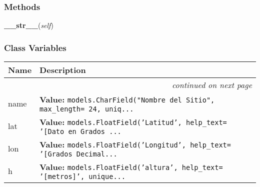  \subsubsection{Methods}

    \label{GroundSegment:models:Sitio:Sitio:__str__}

    \vspace{0.5ex}

\hspace{.8\funcindent}\begin{boxedminipage}{\funcwidth}

    \raggedright \textbf{\_\_str\_\_}(\textit{self})

\setlength{\parskip}{2ex}
\setlength{\parskip}{1ex}
    \end{boxedminipage}



  \subsubsection{Class Variables}

    \vspace{-1cm}
\hspace{\varindent}\begin{longtable}{|p{\varnamewidth}|p{\vardescrwidth}|l}
\cline{1-2}
\cline{1-2} \centering \textbf{Name} & \centering \textbf{Description}& \\
\cline{1-2}
\endhead\cline{1-2}\multicolumn{3}{r}{\small\textit{continued on next page}}\\\endfoot\cline{1-2}
\endlastfoot\raggedright n\-a\-m\-e\- & \raggedright \textbf{Value:} 
{\tt models.CharField("Nombre del Sitio", max\_length= 24, uniq\texttt{...}}&\\
\cline{1-2}
\raggedright l\-a\-t\- & \raggedright \textbf{Value:} 
{\tt models.FloatField('Latitud', help\_text= '[Dato en Grados \texttt{...}}&\\
\cline{1-2}
\raggedright l\-o\-n\- & \raggedright \textbf{Value:} 
{\tt models.FloatField('Longitud', help\_text= '[Grados Decimal\texttt{...}}&\\
\cline{1-2}
\raggedright h\- & \raggedright \textbf{Value:} 
{\tt models.FloatField('altura', help\_text= '[metros]', unique\texttt{...}}&\\
\cline{1-2}
\end{longtable}

